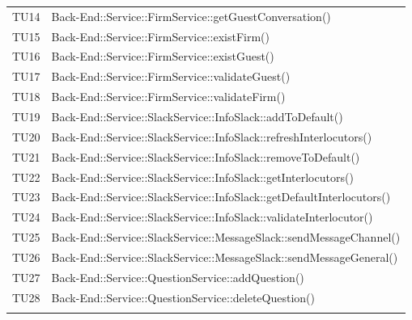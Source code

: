 \documentclass[../PianoDiQualifica_v4.0.0.tex]{subfiles}
\begin{document}
\begin{longtable}[c] { >{\centering\arraybackslash}p{} >{\centering\arraybackslash}p{}}
			\addlinespace[0.3em]
			\midrule
			\addlinespace[0.3em]
			TU14 & Back-End::Service::FirmService::getGuestConversation() \\
			\addlinespace[0.3em]
			\midrule
			\addlinespace[0.3em]
			TU15 & Back-End::Service::FirmService::existFirm() \\
			\addlinespace[0.3em]
			\midrule
			\addlinespace[0.3em]
			TU16 & Back-End::Service::FirmService::existGuest() \\
			\addlinespace[0.3em]
			\midrule
			\addlinespace[0.3em]
			TU17 & Back-End::Service::FirmService::validateGuest() \\
			\addlinespace[0.3em]
			\midrule
			\addlinespace[0.3em]
			TU18 & Back-End::Service::FirmService::validateFirm() \\
			\addlinespace[0.3em]
			\midrule
			\addlinespace[0.3em]
			TU19 & Back-End::Service::SlackService::InfoSlack::addToDefault() \\
			\addlinespace[0.3em]
			\midrule
			\addlinespace[0.3em]
			TU20 & Back-End::Service::SlackService::InfoSlack::refreshInterlocutors() \\
			\addlinespace[0.3em]
			\midrule
			\addlinespace[0.3em]
			TU21 & Back-End::Service::SlackService::InfoSlack::removeToDefault() \\
			\addlinespace[0.3em]
			\midrule
			\addlinespace[0.3em]
			TU22 & Back-End::Service::SlackService::InfoSlack::getInterlocutors() \\
			\addlinespace[0.3em]
			\midrule
			\addlinespace[0.3em]
			TU23 & Back-End::Service::SlackService::InfoSlack::getDefaultInterlocutors() \\
			\addlinespace[0.3em]
			\midrule
			\addlinespace[0.3em]
			TU24 & Back-End::Service::SlackService::InfoSlack::validateInterlocutor() \\
			\addlinespace[0.3em]
			\midrule
			\addlinespace[0.3em]
			TU25 & Back-End::Service::SlackService::MessageSlack::sendMessageChannel() \\
			\addlinespace[0.3em]
			\midrule
			\addlinespace[0.3em]
			TU26 & Back-End::Service::SlackService::MessageSlack::sendMessageGeneral() \\
			\addlinespace[0.3em]
			\midrule
			\addlinespace[0.3em]
			TU27 & Back-End::Service::QuestionService::addQuestion() \\
			\addlinespace[0.3em]
			\midrule
			\addlinespace[0.3em]
			TU28 & Back-End::Service::QuestionService::deleteQuestion() \\
			\addlinespace[0.3em]
			\midrule
			\addlinespace[0.3em]

\end{longtable}
\end{document}
